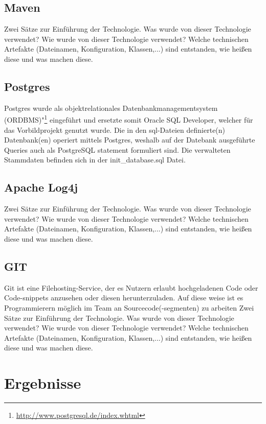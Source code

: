 \documentclass[fleqn,10pt,ngerman]{SelfArx}
\begin{document}
	\subsection{Maven}
	
	Zwei Sätze zur Einführung der Technologie. 
	Was wurde von dieser Technologie verwendet?
	Wie wurde von dieser Technologie verwendet?
	Welche technischen Artefakte (Dateinamen, Konfiguration, Klassen,...) sind entstanden, wie heißen diese und was machen diese. 
	
	\subsection{Postgres}
	Postgres wurde als objektrelationales Datenbankmanagementsystem (ORDBMS)"\footnote{\url{http://www.postgresql.de/index.whtml}} eingeführt und ersetzte somit Oracle SQL Developer, welcher für das Vorbildprojekt genutzt wurde. 
	Die in den sql-Dateien definierte(n) Datenbank(en) operiert mittels Postgres, weshalb auf der Datebank ausgeführte Queries auch als PostgreSQL statement formuliert sind.
	Die verwalteten Stammdaten befinden sich in der init\_database.sql Datei.  	
	
	
	\subsection{Apache Log4j}
	Zwei Sätze zur Einführung der Technologie. 
	Was wurde von dieser Technologie verwendet?
	Wie wurde von dieser Technologie verwendet?
	Welche technischen Artefakte (Dateinamen, Konfiguration, Klassen,...) sind entstanden, wie heißen diese und was machen diese. 
	
	\subsection{GIT}
	Git ist eine Filehosting-Service, der es Nutzern erlaubt hochgeladenen Code oder Code-snippets anzusehen oder diesen herunterzuladen. Auf diese weise ist es Programmierern möglich im Team an Sourcecode(-segmenten) zu arbeiten
	Zwei Sätze zur Einführung der Technologie. 
	Was wurde von dieser Technologie verwendet?
	Wie wurde von dieser Technologie verwendet?
	Welche technischen Artefakte (Dateinamen, Konfiguration, Klassen,...) sind entstanden, wie heißen diese und was machen diese. 
	
	
	
	\section{Ergebnisse}
	
\end{document}
